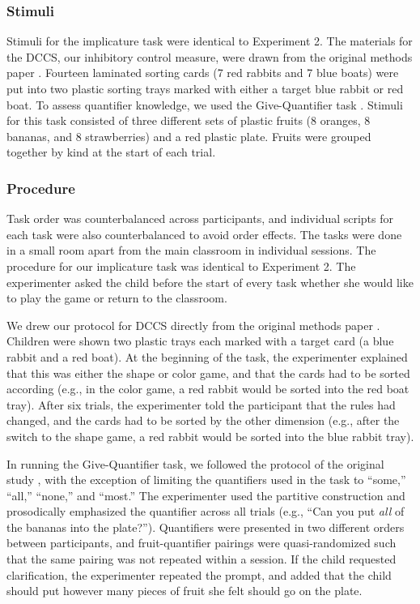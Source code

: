 \documentclass[man]{apa2}
\begin{document}

\subsubsection{Stimuli} Stimuli for the implicature task were identical to Experiment 2. The materials for the DCCS, our inhibitory control measure, were drawn from the original methods paper . Fourteen laminated sorting cards (7 red rabbits and 7 blue boats) were put into two plastic sorting trays marked with either a target blue rabbit or red boat. To assess quantifier knowledge, we used the Give-Quantifier task \cite{barner2009}. Stimuli for this task consisted of three different sets of plastic fruits (8 oranges, 8 bananas, and 8 strawberries) and a red plastic plate. Fruits were grouped together by kind at the start of each trial.

\subsubsection{Procedure}
Task order was counterbalanced across participants, and individual scripts for each task were also counterbalanced to avoid order effects. The tasks were done in a small room apart from the main classroom in individual sessions. The procedure for our implicature task was identical to Experiment 2. The experimenter asked the child before the start of every task whether she would like to play the game or return to the classroom.

We drew our protocol for DCCS directly from the original methods paper . Children were shown two plastic trays each marked with a target card (a blue rabbit and a red boat). At the beginning of the task, the experimenter explained that this was either the shape or color game, and that the cards had to be sorted according (e.g., in the color game, a red rabbit would be sorted into the red boat tray). After six trials, the experimenter told the participant that the rules had changed, and the cards had to be sorted by the other dimension (e.g., after the switch to the shape game, a red rabbit would be sorted into the blue rabbit tray).

In running the Give-Quantifier task, we followed the protocol of the original study , with the exception of limiting the quantifiers used in the task to ``some,'' ``all,'' ``none,'' and ``most.'' The experimenter used the partitive construction and prosodically emphasized the quantifier across all trials (e.g., ``Can you put \textit{all} of the bananas into the plate?''). Quantifiers were presented in two different orders between participants, and fruit-quantifier pairings were quasi-randomized such that the same pairing was not repeated within a session. If the child requested clarification, the experimenter repeated the prompt, and added that the child should put however many pieces of fruit she felt should go on the plate.
\end{document}
